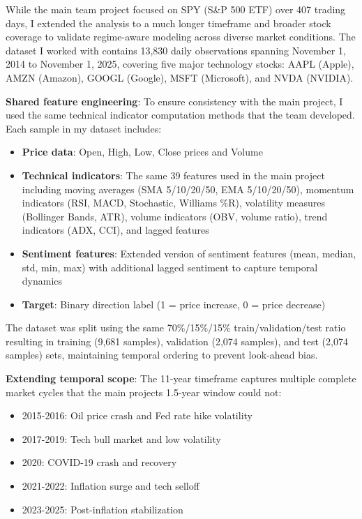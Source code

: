 \documentclass[
]{article}
\begin{document}
While the main team project focused on SPY (S\&P 500 ETF) over 407
trading days, I extended the analysis to a much longer timeframe and
broader stock coverage to validate regime-aware modeling across diverse
market conditions. The dataset I worked with contains 13,830 daily
observations spanning November 1, 2014 to November 1, 2025, covering
five major technology stocks: AAPL (Apple), AMZN (Amazon), GOOGL
(Google), MSFT (Microsoft), and NVDA (NVIDIA).

\textbf{Shared feature engineering}: To ensure consistency with the main
project, I used the same technical indicator computation methods that
the team developed. Each sample in my dataset includes:

\begin{itemize}
\item
  \textbf{Price data}: Open, High, Low, Close prices and Volume
\item
  \textbf{Technical indicators}: The same 39 features used in the main
  project including moving averages (SMA 5/10/20/50, EMA 5/10/20/50),
  momentum indicators (RSI, MACD, Stochastic, Williams \%R), volatility
  measures (Bollinger Bands, ATR), volume indicators (OBV, volume
  ratio), trend indicators (ADX, CCI), and lagged features
\item
  \textbf{Sentiment features}: Extended version of sentiment features
  (mean, median, std, min, max) with additional lagged sentiment to
  capture temporal dynamics
\item
  \textbf{Target}: Binary direction label (1 = price increase, 0 = price
  decrease)
\end{itemize}

The dataset was split using the same 70\%/15\%/15\%
train/validation/test ratio resulting in training (9,681 samples),
validation (2,074 samples), and test (2,074 samples) sets, maintaining
temporal ordering to prevent look-ahead bias.

\textbf{Extending temporal scope}: The 11-year timeframe captures
multiple complete market cycles that the main project\textquotesingle s
1.5-year window could not:

\begin{itemize}
\item
  2015-2016: Oil price crash and Fed rate hike volatility
\item
  2017-2019: Tech bull market and low volatility
\item
  2020: COVID-19 crash and recovery
\item
  2021-2022: Inflation surge and tech selloff
\item
  2023-2025: Post-inflation stabilization
\end{itemize}
\end{document}
